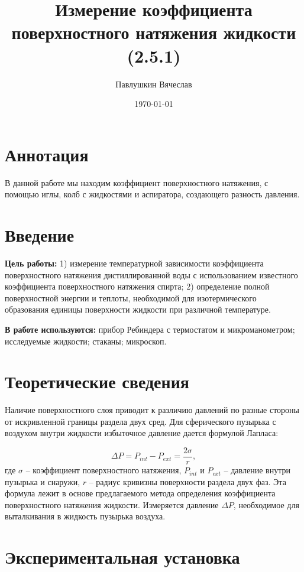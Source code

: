 \documentclass[a4paper,12pt]{article}
\title{Измерение коэффициента поверхностного натяжения жидкости (2.5.1)}
\author{Павлушкин Вячеслав}
\date{\today}
\theoremstyle{definition}
\begin{document}
	\maketitle
	\section{Аннотация}
	В данной работе мы находим коэффициент поверхностного натяжения, с помощью иглы, колб с жидкостями и аспиратора, создающего разность давления.
	\section{Введение}
	\noindent\textbf{Цель работы:}
	1) измерение температурной зависимости  коэффициента поверхностного натяжения дистиллированной воды с использованием известного коэффициента поверхностного натяжения спирта; 2) определение полной поверхностной энергии  и теплоты, необходимой для изотермического образования единицы  поверхности жидкости  при различной температуре.
	
	\bigskip
	\noindent\textbf{В работе используются:} прибор  Ребиндера  с термостатом и микроманометром; исследуемые жидкости; стаканы; микроскоп.
	\section{Теоретические сведения}
	
	Наличие поверхностного слоя приводит к различию давлений по разные стороны от искривленной границы раздела двух сред.  Для сферического пузырька с воздухом  внутри жидкости избыточное давление дается формулой Лапласа:
	
	\begin{equation}
		\Delta P = P_{int} - P_{ext} = \frac{2\sigma}{r},
		\label{key}
	\end{equation}
	где $ \sigma $ -- коэффициент поверхностного натяжения, $ P_{int} $ и $ P_{ext} $ -- давление внутри пузырька и снаружи, $ r $ -- радиус кривизны поверхности раздела двух фаз. Эта формула лежит в основе предлагаемого метода определения коэффициента поверхностного натяжения жидкости. Измеряется давление $ \Delta P $, необходимое для выталкивания в жидкость пузырька воздуха.
	
	\section{Экспериментальная установка}
	
\end{document}
